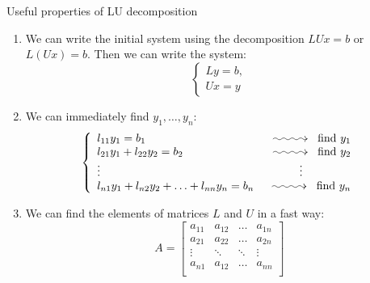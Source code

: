 \begin{note}{Useful properties of LU decomposition}{}
\begin{itemize}
\begin{enumerate}
\[\begin{tikzpicture}[baseline={([yshift=-.5ex]current bounding box.center)}]
                    \node[circle,draw,rotate=60,scale=1.5,yscale=2.5,xscale=1.5,line width=2] (c) at (-1.25,-0.75){}; 
                    \node[anchor=north east] at ([shift={(-0.5cm,-0.25cm)}]A.north east) {\scalebox{5}{*}};
                    \node[anchor=south] at ([shift={(0.cm,-0.75cm)}]A.south) {\Large U};
                \end{tikzpicture} 
            \]
            \item We can write the initial system using the decomposition $LUx = b$ or $L(Ux) = b$. Then we can write the system:
            \[
                \left\{
                    \begin{array}{c}
                        Ly = b, \\
                        Ux = y
                    \end{array} 
                \right.  
            \]
            \item We can immediately find $y_1, \ldots, y_n$:
            \[
                \left\{
                    \begin{array}{lr}
                        l_{11} y_1 = b_1 & \xymatrix@C=3em{{}\ar@{~>}[r]&{}} \text{ find } y_1\\
                        l_{21}y_1 + l_{22} y_2 = b_2 & \xymatrix@C=3em{{}\ar@{~>}[r]&{}} \text{ find } y_2\\
                        \vdots & \vdots \hspace*{1.5cm}\\
                        l_{n1} y_1 + l_{n2}y_2+ \ldots + l_{nn}y_n = b_n  & \xymatrix@C=3em{{}\ar@{~>}[r]&{}} \text{ find } y_n
                    \end{array}
                \right.
            \]
            \item We can find the elements of matrices $L$ and $U$ in a fast way:
            \[
                A = \begin{bmatrix}
                    a_{11} & a_{12} & \ldots & a_{1n}\\
                    a_{21} & a_{22} & \ldots & a_{2n}\\
                    \vdots & \ddots & \ddots & \vdots\\
                    a_{n1} & a_{12} & \ldots & a_{nn}\\


\end{bmatrix}\]
\end{enumerate}
\end{itemize}
\end{note}
